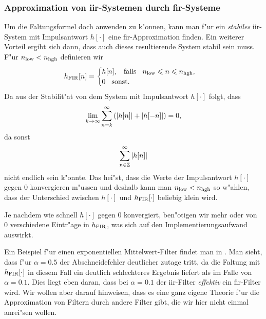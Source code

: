 \subsubsection{Approximation von \texorpdfstring{\acrshort{iir}}{IIR}-Systemen durch \texorpdfstring{\acrshort{fir}}{FIR}-Systeme}
Um die Faltungsformel doch anwenden zu k"onnen, kann man f"ur ein \emph{stabiles} \gls{iir}-System mit Impulsantwort $h[\cdot]$ eine \gls{fir}-Approximation finden.
Ein weiterer Vorteil ergibt sich dann, dass auch dieses resultierende System stabil sein muss.
F"ur $n_{\rm low} < n_{\rm hgh}$ definieren wir
\[
h_{\rm FIR}[n] = \begin{cases}
    h[n], {\hspace{3mm} \text{falls} \hspace{3mm}} n_{\rm low} \leqslant n \leqslant n_{\rm hgh}, \\
    0 {\hspace{3mm} \text{sonst.} \hspace{3mm}}
\end{cases}
\]
Da aus der Stabilit"at von dem System mit Impulsantwort $h[\cdot]$ folgt, dass
\[
    \lim\limits_{k \rightarrow \infty} 
        {\sum\limits_{n = k}^{\infty}{
            \left({\left| h[n] \right|} + {\left| h[-n] \right|}\right)
        }} = 0,
\]
da sonst
\[
    {\sum\limits_{n \in \mathbb{Z}}^{\infty}{{\left| h[n] \right|}}}
\]
nicht endlich sein k"onnte.
Das hei"st, dass die Werte der Impulsantwort $h[\cdot]$ gegen $0$ konvergieren m"ussen und deshalb kann man $n_{\rm low} < n_{\rm hgh}$ so w"ahlen, dass der Unterschied zwischen $h[\cdot]$ und $h_{\rm FIR}[\cdot]$ beliebig klein wird.

Je nachdem wie schnell $h[\cdot]$ gegen $0$ konvergiert, ben"otigen wir mehr oder von $0$ verschiedene Eintr"age in $h_{\rm FIR}$, was sich auf den Implementierungsaufwand auswirkt.

Ein Beispiel f"ur einen exponentiellen Mittelwert-Filter findet man in .
Man sieht, dass f"ur $\alpha=0.5$ der Abschneidefehler deutlicher zutage tritt, da die Faltung mit $h_{\rm FIR}[\cdot]$ in diesem Fall ein deutlich schlechteres Ergebnis liefert als im Falle von $\alpha=0.1$.
Dies liegt eben daran, dass bei $\alpha=0.1$ der \gls{iir}-Filter \emph{effektiv} ein \gls{fir}-Filter wird.
Wir wollen aber darauf hinweisen, dass es eine ganz eigene Theorie f"ur die Approximation von Filtern durch andere Filter gibt, die wir hier nicht einmal anrei"sen wollen.

